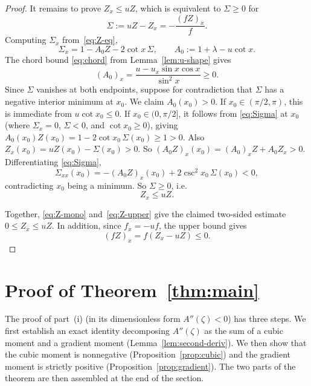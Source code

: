 \documentclass{amsart}
\begin{document}
\begin{proof}
It remains to prove $Z_x\leq uZ$, which is equivalent to $\Sigma\geq 0$ for
\[
\Sigma:=uZ-Z_x=-\frac{(fZ)_x}{f}.
\]
Computing $\Sigma_x$ from~\eqref{eq:Z-eq},
\begin{equation}\label{eq:Sigma}
\Sigma_x=1-A_0Z-2\cot x\,\Sigma,\qquad A_0:=1+\lambda-u\cot x .
\end{equation}
The chord bound \eqref{eq:chord} from Lemma~\ref{lem:u-shape} gives
\[
(A_0)_x=\frac{u-u_x\sin x\cos x}{\sin^2x}\geq 0.
\]
Since $\Sigma$ vanishes at both endpoints, suppose for contradiction
that $\Sigma$ has a negative interior minimum at $x_0$. We claim
$A_0(x_0)>0$. If $x_0\in(\pi/2,\pi)$, this is immediate from
$u\cot x_0\leq 0$. If $x_0\in(0,\pi/2]$, it follows from
\eqref{eq:Sigma} at $x_0$ (where $\Sigma_x=0$, $\Sigma<0$, and
$\cot x_0\geq 0$), giving
$A_0(x_0)Z(x_0)=1-2\cot x_0\,\Sigma(x_0)\geq 1>0$. Also
$Z_x(x_0)=uZ(x_0)-\Sigma(x_0)>0$. So
$(A_0Z)_x(x_0)=(A_0)_xZ+A_0Z_x>0$. Differentiating \eqref{eq:Sigma},
\[
\Sigma_{xx}(x_0)=-(A_0Z)_x(x_0)+2\csc^2x_0\,\Sigma(x_0)<0 ,
\]
contradicting $x_0$ being a minimum. So $\Sigma\geq 0$, i.e.\
\begin{equation}\label{eq:Z-upper}
Z_x\leq uZ.
\end{equation}

Together, \eqref{eq:Z-mono} and~\eqref{eq:Z-upper} give the claimed
two-sided estimate $0\leq Z_x\leq uZ$. In addition, since $f_x=-uf$,
the upper bound gives
\[
(fZ)_x=f(Z_x-uZ)\leq0.
\]
\end{proof}

\section{Proof of Theorem~\ref{thm:main}}\label{sec:proof}

The proof of part~(i) (in its dimensionless form $A''(\zeta)<0$)
has three steps. We first establish an exact identity decomposing
$A''(\zeta)$ as the sum of a cubic moment and a gradient moment
(Lemma~\ref{lem:second-deriv}). We then show that the cubic moment is
nonnegative (Proposition~\ref{prop:cubic}) and the gradient moment is
strictly positive (Proposition~\ref{prop:gradient}). The two parts of the
theorem are then assembled at the end of the section.
\end{document}
